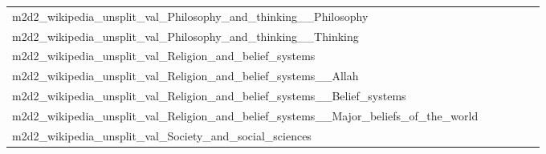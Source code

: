 \documentclass[dvipsnames]{article}
\begin{document}
\begin{appendix}
{\begin{longtable}{m{6cm}m{1.7cm}m{1.7cm}m{1.7cm}m{1.7cm}m{1.7cm}}
	m2d2\_wikipedia\_unsplit\_val\_Philosophy\_and\_thinking\_\_Philosophy  & \colorbox[HTML]{fdfede}{\makebox[\mywidth][c]{12.00}} & \colorbox[HTML]{e0f2a8}{\makebox[\mywidth][c]{11.61}} & \colorbox[HTML]{ffffe5}{\makebox[\mywidth][c]{12.66}} & \colorbox[HTML]{d4eea0}{\makebox[\mywidth][c]{11.57}} & \colorbox[HTML]{77c578}{\makebox[\mywidth][c]{11.43}}\\
	m2d2\_wikipedia\_unsplit\_val\_Philosophy\_and\_thinking\_\_Thinking  & \colorbox[HTML]{fefee2}{\makebox[\mywidth][c]{10.94}} & \colorbox[HTML]{edf8b2}{\makebox[\mywidth][c]{10.61}} & \colorbox[HTML]{ffffe5}{\makebox[\mywidth][c]{11.34}} & \colorbox[HTML]{ddf1a6}{\makebox[\mywidth][c]{10.56}} & \colorbox[HTML]{77c578}{\makebox[\mywidth][c]{10.42}}\\
	m2d2\_wikipedia\_unsplit\_val\_Religion\_and\_belief\_systems  & \colorbox[HTML]{fdfedf}{\makebox[\mywidth][c]{12.81}} & \colorbox[HTML]{f0f9b4}{\makebox[\mywidth][c]{12.45}} & \colorbox[HTML]{ffffe5}{\makebox[\mywidth][c]{13.44}} & \colorbox[HTML]{e0f2a8}{\makebox[\mywidth][c]{12.38}} & \colorbox[HTML]{77c578}{\makebox[\mywidth][c]{12.19}}\\
	m2d2\_wikipedia\_unsplit\_val\_Religion\_and\_belief\_systems\_\_Allah  & \colorbox[HTML]{fdfedf}{\makebox[\mywidth][c]{11.11}} & \colorbox[HTML]{eff8b3}{\makebox[\mywidth][c]{10.80}} & \colorbox[HTML]{ffffe5}{\makebox[\mywidth][c]{11.66}} & \colorbox[HTML]{d3eda0}{\makebox[\mywidth][c]{10.71}} & \colorbox[HTML]{77c578}{\makebox[\mywidth][c]{10.58}}\\
	m2d2\_wikipedia\_unsplit\_val\_Religion\_and\_belief\_systems\_\_Belief\_systems  & \colorbox[HTML]{fefee3}{\makebox[\mywidth][c]{11.46}} & \colorbox[HTML]{f1f9b4}{\makebox[\mywidth][c]{11.06}} & \colorbox[HTML]{ffffe5}{\makebox[\mywidth][c]{11.86}} & \colorbox[HTML]{c9e99b}{\makebox[\mywidth][c]{10.95}} & \colorbox[HTML]{77c578}{\makebox[\mywidth][c]{10.85}}\\
	m2d2\_wikipedia\_unsplit\_val\_Religion\_and\_belief\_systems\_\_Major\_beliefs\_of\_the\_world  & \colorbox[HTML]{fefee0}{\makebox[\mywidth][c]{12.38}} & \colorbox[HTML]{f0f9b4}{\makebox[\mywidth][c]{12.03}} & \colorbox[HTML]{ffffe5}{\makebox[\mywidth][c]{12.94}} & \colorbox[HTML]{cae99c}{\makebox[\mywidth][c]{11.91}} & \colorbox[HTML]{77c578}{\makebox[\mywidth][c]{11.79}}\\
	m2d2\_wikipedia\_unsplit\_val\_Society\_and\_social\_sciences  & \colorbox[HTML]{fdfedf}{\makebox[\mywidth][c]{10.53}} & \colorbox[HTML]{ecf7b1}{\makebox[\mywidth][c]{10.24}} & \colorbox[HTML]{ffffe5}{\makebox[\mywidth][c]{11.03}} & \colorbox[HTML]{d3eda0}{\makebox[\mywidth][c]{10.16}} & \colorbox[HTML]{77c578}{\makebox[\mywidth][c]{10.05}}\\

\end{longtable}}
\end{appendix}
\end{document}
